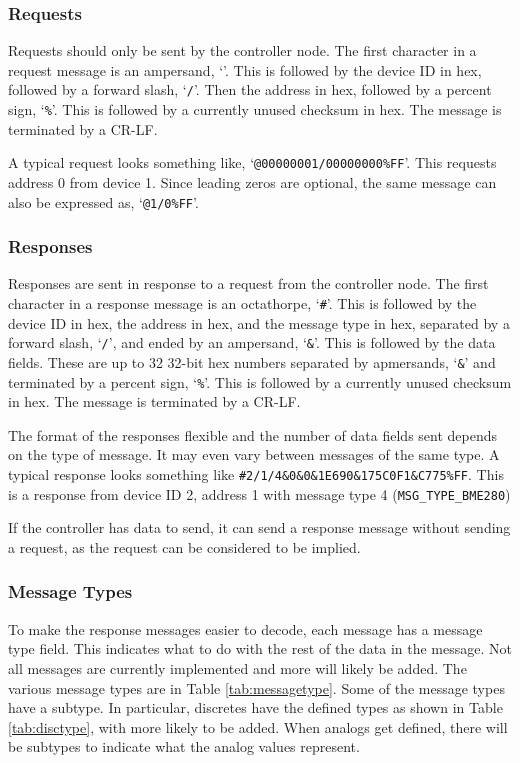 \documentclass[10pt, openany, draft]{article}
\begin{document}
\subsubsection{Requests}
Requests should only be sent by the controller node.  The first character in a request message is an ampersand, `\texttt{\@}'.  This is followed by the device ID in hex, followed by a forward slash, `\texttt{/}'.  Then the address in hex, followed by a percent sign, `\texttt{\%}'.  This is followed by a currently unused checksum in hex.  The message is terminated by a CR-LF.

A typical request looks something like, `\texttt{@00000001/00000000\%FF}'.  This requests address 0 from device 1.  Since leading zeros are optional, the same message can also be expressed as, `\texttt{@1/0\%FF}'.

\subsubsection{Responses}
Responses are sent in response to a request from the controller node.  The first character in a response message is an octathorpe, `\texttt{\#}'.  This is followed by the device ID in hex, the address in hex, and the message type in hex, separated by a forward slash, `\texttt{/}', and ended by an ampersand, `\texttt{\&}'.  This is followed by the data fields.  These are up to 32 32-bit hex numbers separated by apmersands, `\texttt{\&}' and terminated by a percent sign, `\texttt{\%}'.  This is followed by a currently unused checksum in hex.  The message is terminated by a CR-LF.

The format of the responses flexible and the number of data fields sent depends on the type of message.  It may even vary between messages of the same type.  A typical response looks something like \texttt{\#2/1/4\&0\&0\&1E690\&175C0F1\&C775\%FF}.  This is a response from device ID 2, address 1 with message type 4 (\texttt{MSG\_TYPE\_BME280})

If the controller has data to send, it can send a response message without sending a request, as the request can be considered to be implied.

\subsubsection{Message Types}
To make the response messages easier to decode, each message has a message type field.  This indicates what to do with the rest of the data in the message.  Not all messages are currently implemented and more will likely be added.  The various message types are in Table \ref{tab:messagetype}.  Some of the message types have a subtype.  In particular, discretes have the defined types as shown in Table \ref{tab:disctype}, with more likely to be added.  When analogs get defined, there will be subtypes to indicate what the analog values represent.
\end{document}
